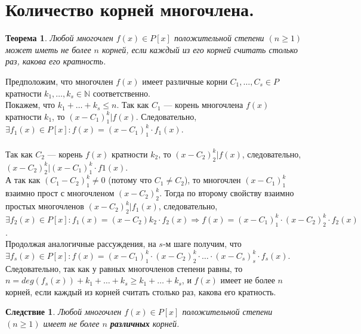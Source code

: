 \section{Количество корней многочлена.}
\newtheorem*{871}{Теорема}
\begin{871}
	Любой многочлен $f(x) \in P[x]$ положительной степени $(n\geqslant 1)$ может иметь не более $n$ корней, если каждый из 
	его корней считать столько раз, какова его кратность. 	
\end{871}
\begin{Proof}
	Предположим, что многочлен $f(x)$ имеет различные корни $C_1, \dots, C_s \in P$ кратности $k_1, \dots, k_s \in \mathbb{N}$ соответственно. \\
	Покажем, что $k_1 + \ldots + k_s \leqslant n$. 
	Так как $C_1$ --- корень многочлена $f(x)$ кратности $k_1$, то $(x - C_1)
	^k_1|f(x)$. Следовательно, $\exists f_1(x)\in P[x]: f(x) = (x - C_1)^k_1 \cdot f_1(x)$.\\\\ 
	Так как $C_2$ --- корень $f(x)$ кратности $k_2$, то $(x - C_2)^
	k_2|f(x)$, следовательно, $(x - C_2)^
	k_2|(x - C_1)
	^k_1\cdot f1(x)$.\\ А так как $(C_1 - C_2)^k_1 \not= 0$ 
	(потому что $C_1 \not= C_2$), то многочлен $(x - C_1)
	^k_1$ взаимно прост с многочленом $(x - C_2)^
	k_2$. Тогда по второму свойству взаимно простых 
	многочленов $(x - C_2)^
	k_2|f_1(x)$, следовательно, $\exists f_2(x) \in P[x]: f_1(x) = (x - C_2)
	k_2 \cdot f_2(x) \Rightarrow f(x) = (x - C_1)
	^k_1 \cdot (x - C_2)^k_2\cdot f_2(x)$.\\
	Продолжая аналогичные рассуждения, на $s$-м шаге получим, что $\exists f_s(x) \in P[x]: f(x) = (x - C_1)^k_1 \cdot 
	(x - C_2)^k_2 \cdot \ldots \cdot (x - C_s)^
	k_s\cdot f_s(x)$. Следовательно, так как у равных многочленов степени равны, то $n = deg(f_s(x)) + k_1 + \ldots 
	+ k_s \geqslant k_1 + \ldots + k_s$, и $f(x)$ имеет не более $n$ корней, если каждый из корней считать столько раз, какова
	его кратность.
\end{Proof}
\newtheorem*{872}{Следствие}
\begin{872}
	Любой многочлен $f(x) \in P[x]$ положительной степени $(n\geqslant 1)$ имеет не более $n$ \textbf{различных} корней.
\end{872}
\newtheorem*{873}{Следствие (Формула Виета)}
